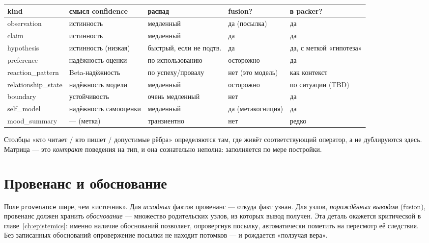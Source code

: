 \begin{center}
\begin{tabular}{p{} p{} p{} p{} p{}}
\toprule
\textbf{kind} & \textbf{смысл confidence} & \textbf{распад} & \textbf{fusion?} & \textbf{в packer?} \\
\midrule
observation & истинность & медленный & да (посылка) & да \\
claim & истинность & медленный & да & да \\
hypothesis & истинность (низкая) & быстрый, если не подтв. & да & да, с меткой «гипотеза» \\
preference & надёжность оценки & по использованию & осторожно & да \\
reaction\_pattern & Beta-надёжность & по успеху/провалу & нет (это модель) & как контекст \\
relationship\_state & надёжность модели & медленный & осторожно & по ситуации (TBD) \\
boundary & устойчивость & очень медленный & нет & да \\
self\_model & надёжность самооценки & медленный & да (метакогниция) & да \\
mood\_summary & — (метка) & транзиентно & нет & редко \\
\bottomrule
\end{tabular}
\end{center}

Столбцы «кто читает / кто пишет / допустимые рёбра» определяются там, где живёт
соответствующий оператор, а не дублируются здесь. Матрица — это \emph{контракт}
поведения на тип, и она сознательно неполна: заполняется по мере постройки.

\section{Провенанс и обоснование}
\label{sec:prov}

Поле \texttt{provenance} шире, чем «источник». Для \emph{исходных} фактов провенанс
— откуда факт узнан. Для узлов, \emph{порождённых выводом} (fusion), провенанс
должен хранить \emph{обоснование} — множество родительских узлов, из которых вывод
получен. Эта деталь окажется критической в главе~\ref{ch:epistemics}: именно
наличие обоснований позволяет, опровергнув посылку, автоматически пометить на
пересмотр её следствия. Без записанных обоснований опровержение посылки не находит
потомков — и рождается «ползучая вера».

